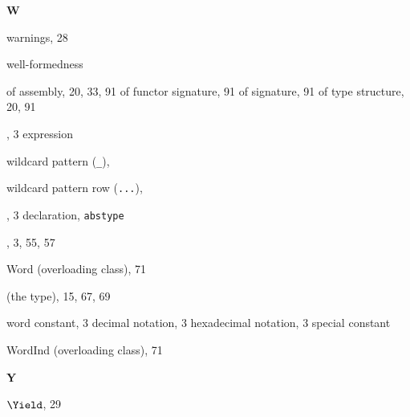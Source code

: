 \begin{theindex}
\parbox{65mm}{\hfil{\large\bf W}\hfil}

\indexspace

\item warnings,  28
\item well-formedness

\subitem of assembly, 20, 33, 91
\subitem of functor signature, 91
\subitem of signature, 91
\subitem of type structure, 20, 91
\item \WHILE, 3
\subitem \seealso expression
\item wildcard pattern (\verb+_+), \underscorewildrefs
\item wildcard pattern row (\verb+...+), \dotdotdotrefs
\item \WITH, 3
\subitem \seealso declaration, {\tt abstype}
\item \WITHTYPE, 3, 55, 57
\item Word (overloading class), 71
\item {} (the type), 15, 67, 69
\item word constant, 3
\subitem decimal notation, 3
\subitem hexadecimal notation, 3
\subitem \seealso special constant
\item WordInd (overloading class), 71
\indexspace

\parbox{65mm}{\hfil{\large\bf Y}\hfil}

\indexspace

\item $\Yield$, 29
\end{theindex}
